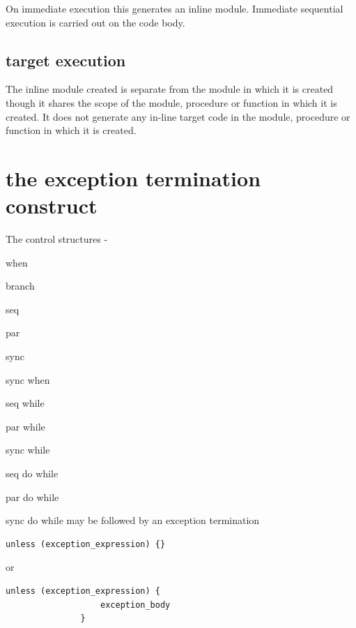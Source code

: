             On immediate execution this generates an inline module.
            Immediate sequential execution is carried out on the code body.
        
        \subsection{target execution}

            The inline module created is separate from the module in
            which it is created though it shares the scope of the
            module, procedure or function in which it is created. It does not
            generate any in-line target code in the module, procedure or
            function in which it is created.


    \section{the exception termination construct}\label{sec:excep_term}
        
        The control structures -
        \blist
        \item   when
        \item   branch
        \item   seq
        \item   par
        \item   sync
        \item   sync when
        \item   seq while
        \item   par while
        \item   sync while
        \item   seq do while
        \item   par do while
        \item   sync do while
        \blend        
        may be followed by an exception termination
        \begin{lstlisting}[gobble=8, language=threepl]
               unless (exception_expression) {}
        \end{lstlisting}
        or
        \begin{lstlisting}[gobble=8, language=threepl]
               unless (exception_expression) {
                   exception_body
               }
        \end{lstlisting}
        
